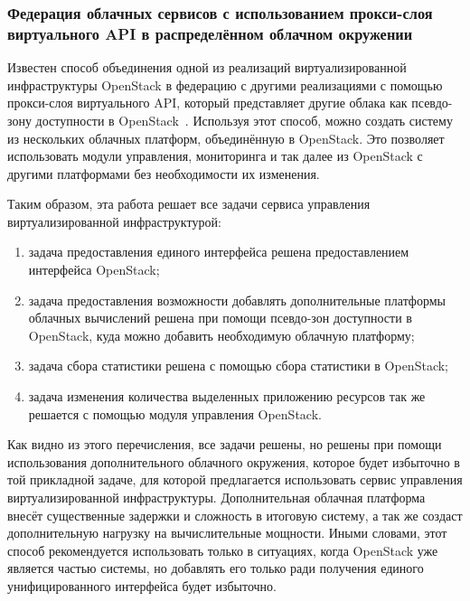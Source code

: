 \subsubsection*{Федерация облачных сервисов с использованием прокси-слоя виртуального API в распределённом облачном окружении}
Известен способ объединения одной из реализаций виртуализированной инфраструктуры OpenStack в федерацию с другими реализациями с помощью прокси-слоя виртуального API, который представляет другие облака как псевдо-зону доступности в OpenStack~\cite{federated-cloud-services}.
Используя этот способ, можно создать систему из нескольких облачных платформ, объединённую в OpenStack. Это позволяет использовать модули управления, мониторинга и так далее из OpenStack с другими платформами без необходимости их изменения.

Таким образом, эта работа решает все задачи сервиса управления виртуализированной инфраструктурой:
\begin{enumerate}
    \item задача предоставления единого интерфейса решена предоставлением интерфейса OpenStack;
    \item задача предоставления возможности добавлять дополнительные платформы облачных вычислений решена при помощи псевдо-зон доступности в OpenStack, куда можно добавить необходимую облачную платформу;
    \item задача сбора статистики решена с помощью сбора статистики в OpenStack;
    \item задача изменения количества выделенных приложению ресурсов так же решается с помощью модуля управления OpenStack.
\end{enumerate}
Как видно из этого перечисления, все задачи решены, но решены при помощи использования дополнительного облачного окружения, которое будет избыточно в той прикладной задаче, для которой предлагается использовать сервис управления виртуализированной инфраструктуры.
Дополнительная облачная платформа внесёт существенные задержки и сложность в итоговую систему, а так же создаст дополнительную нагрузку на вычислительные мощности.
Иными словами, этот способ рекомендуется использовать только в ситуациях, когда OpenStack уже является частью системы, но добавлять его только ради получения единого унифицированного интерфейса будет избыточно.